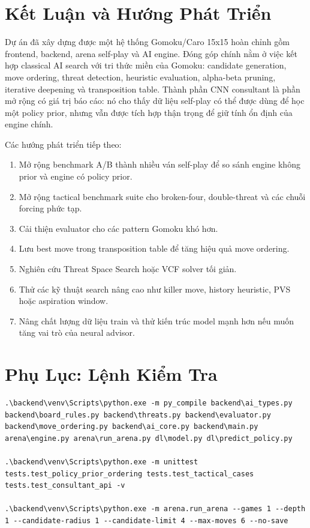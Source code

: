\documentclass[12pt,a4paper]{article}
\begin{document}
\section{Kết Luận và Hướng Phát Triển}
\label{sec:conclusion}

Dự án đã xây dựng được một hệ thống Gomoku/Caro 15x15 hoàn chỉnh gồm frontend, backend, arena self-play và AI engine. Đóng góp chính nằm ở việc kết hợp classical AI search với tri thức miền của Gomoku: candidate generation, move ordering, threat detection, heuristic evaluation, alpha-beta pruning, iterative deepening và transposition table. Thành phần CNN consultant là phần mở rộng có giá trị báo cáo: nó cho thấy dữ liệu self-play có thể được dùng để học một policy prior, nhưng vẫn được tích hợp thận trọng để giữ tính ổn định của engine chính.

Các hướng phát triển tiếp theo:

\begin{enumerate}[leftmargin=*]
  \item Mở rộng benchmark A/B thành nhiều ván self-play để so sánh engine không prior và engine có policy prior.
  \item Mở rộng tactical benchmark suite cho broken-four, double-threat và các chuỗi forcing phức tạp.
  \item Cải thiện evaluator cho các pattern Gomoku khó hơn.
  \item Lưu best move trong transposition table để tăng hiệu quả move ordering.
  \item Nghiên cứu Threat Space Search hoặc VCF solver tối giản.
  \item Thử các kỹ thuật search nâng cao như killer move, history heuristic, PVS hoặc aspiration window.
  \item Nâng chất lượng dữ liệu train và thử kiến trúc model mạnh hơn nếu muốn tăng vai trò của neural advisor.
\end{enumerate}

\appendix

\section{Phụ Lục: Lệnh Kiểm Tra}

\begin{lstlisting}[language={}]
.\backend\venv\Scripts\python.exe -m py_compile backend\ai_types.py backend\board_rules.py backend\threats.py backend\evaluator.py backend\move_ordering.py backend\ai_core.py backend\main.py arena\engine.py arena\run_arena.py dl\model.py dl\predict_policy.py

.\backend\venv\Scripts\python.exe -m unittest tests.test_policy_prior_ordering tests.test_tactical_cases tests.test_consultant_api -v

.\backend\venv\Scripts\python.exe -m arena.run_arena --games 1 --depth 1 --candidate-radius 1 --candidate-limit 4 --max-moves 6 --no-save
\end{lstlisting}
\end{document}
